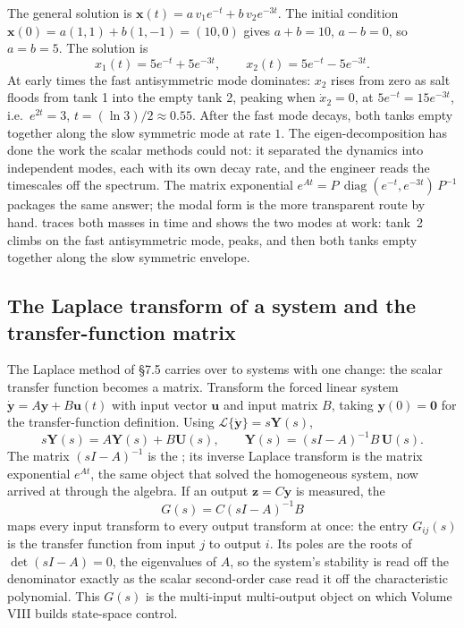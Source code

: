 The general solution is $\mathbf{x}(t) = a\, v_{1} e^{-t} + b\, v_{2}
e^{-3t}$. The initial condition $\mathbf{x}(0) = a(1,1) + b(1,-1) =
(10, 0)$ gives $a + b = 10$, $a - b = 0$, so $a = b = 5$. The
solution is
\[
x_{1}(t) = 5 e^{-t} + 5 e^{-3t}, \qquad x_{2}(t) = 5 e^{-t} -
5 e^{-3t}.
\]
At early times the fast antisymmetric mode dominates: $x_{2}$ rises
from zero as salt floods from tank 1 into the empty tank 2, peaking
when $\dot{x}_{2} = 0$, at $5 e^{-t} = 15 e^{-3t}$, i.e.\ $e^{2t} =
3$, $t = (\ln 3)/2 \approx 0.55$. After the fast mode decays, both
tanks empty together along the slow symmetric mode at rate $1$. The
eigen-decomposition has done the work the scalar methods could not:
it separated the dynamics into independent modes, each with its own
decay rate, and the engineer reads the timescales off the spectrum.
The matrix exponential $e^{At} = P\, \operatorname{diag}(e^{-t},
e^{-3t})\, P^{-1}$ packages the same answer; the modal form is the
more transparent route by hand. 
traces both masses in time and shows the two modes at work: tank~2
climbs on the fast antisymmetric mode, peaks, and then both tanks empty
together along the slow symmetric envelope.



\subsection{The Laplace transform of a system and the transfer-function matrix}

The Laplace method of \S7.5 carries over to systems with one change:
the scalar transfer function becomes a matrix. Transform the forced
linear system $\dot{\mathbf{y}} = A\mathbf{y} + B\mathbf{u}(t)$ with
input vector $\mathbf{u}$ and input matrix $B$, taking $\mathbf{y}(0) =
\mathbf{0}$ for the transfer-function definition. Using
$\mathcal{L}\{\dot{\mathbf{y}}\} = s\mathbf{Y}(s)$,
\[
s\mathbf{Y}(s) = A\mathbf{Y}(s) + B\mathbf{U}(s),
\qquad
\mathbf{Y}(s) = (sI - A)^{-1} B\, \mathbf{U}(s).
\]
The matrix $(sI - A)^{-1}$ is the ; its inverse
Laplace transform is the matrix exponential $e^{At}$, the same object
that solved the homogeneous system, now arrived at through the
algebra. If an output $\mathbf{z} = C\mathbf{y}$ is measured, the
\[
G(s) = C(sI - A)^{-1}B
\]
maps every input transform to every output transform at once: the
entry $G_{ij}(s)$ is the transfer function from input $j$ to output
$i$. Its poles are the roots of $\det(sI - A) = 0$, the eigenvalues of
$A$, so the system's stability is read off the denominator exactly as
the scalar second-order case read it off the characteristic
polynomial. This $G(s)$ is the multi-input multi-output object on which
Volume VIII builds state-space control.

